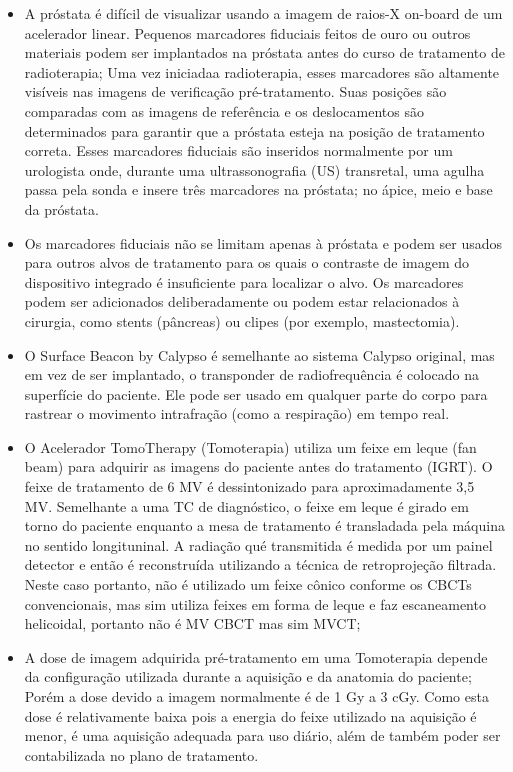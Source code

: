 \documentclass[11pt,a4paper]{article}
\newcounter{exemplo}
\begin{document}
\begin{exemplo}[IGRT]
\begin{itemize}
        \item A próstata é difícil de visualizar usando a imagem de raios-X on-board de um acelerador linear. Pequenos marcadores fiduciais feitos de ouro ou outros materiais podem ser implantados na próstata antes do curso de tratamento de radioterapia; Uma vez iniciadaa radioterapia, esses marcadores são altamente visíveis nas imagens de verificação pré-tratamento. Suas posições são comparadas com as imagens de referência e os deslocamentos são determinados para garantir que a próstata esteja na posição de tratamento correta. Esses marcadores fiduciais são inseridos normalmente por um urologista onde, durante uma ultrassonografia (US) transretal, uma agulha passa pela sonda e insere três marcadores na próstata; no ápice, meio e base da próstata.
        
        \item Os marcadores fiduciais não se limitam apenas à próstata e podem ser usados para outros alvos de tratamento para os quais o contraste de imagem do dispositivo integrado é insuficiente para localizar o alvo. Os marcadores podem ser adicionados deliberadamente ou podem estar relacionados à cirurgia, como stents (pâncreas) ou clipes (por exemplo, mastectomia).
        
        \item O Surface Beacon by Calypso é semelhante ao sistema Calypso original, mas em vez de ser implantado, o transponder de radiofrequência é colocado na superfície do paciente. Ele pode ser usado em qualquer parte do corpo para rastrear o movimento intrafração (como a respiração) em tempo real.
        
        \item O Acelerador TomoTherapy (Tomoterapia) utiliza um feixe em leque (fan beam) para adquirir as imagens do paciente antes do tratamento (IGRT). O feixe de tratamento de 6 MV é dessintonizado para aproximadamente 3,5 MV. Semelhante a uma TC de diagnóstico, o feixe em leque é girado em torno do paciente enquanto a mesa de tratamento é transladada pela máquina no sentido longituninal. A radiação qué transmitida é medida por um painel detector e então é reconstruída utilizando a técnica de retroprojeção filtrada. Neste caso portanto, não é utilizado um feixe cônico conforme os CBCTs convencionais, mas sim utiliza feixes em forma de leque e faz escaneamento helicoidal, portanto não é MV CBCT mas sim MVCT;
        
        \item A dose de imagem adquirida pré-tratamento em uma Tomoterapia depende da configuração utilizada durante a aquisição e da anatomia do paciente; Porém a dose devido a imagem normalmente é de 1 Gy a 3 cGy. Como esta dose é relativamente baixa pois a energia do feixe utilizado na aquisição é menor, é uma aquisição adequada para uso diário, além de também poder ser contabilizada no plano de tratamento.
        

\end{itemize}
\end{exemplo}
\end{document}
